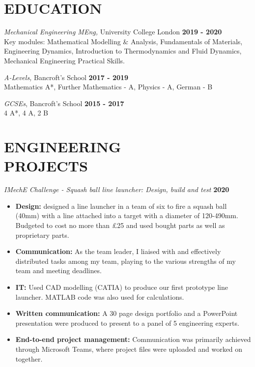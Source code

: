 \documentclass[margin, 10pt]{res} %
\begin{document}
\begin{resume}

 
\section{EDUCATION}  

{\sl Mechanical Engineering MEng,} University College London \hfill \textbf{2019 - 2020}\\
Key modules: Mathematical Modelling \& Analysis, Fundamentals of Materials,\\ 
Engineering Dynamics, Introduction to Thermodynamics and Fluid Dynamics, \\
Mechanical Engineering Practical Skills.

{\sl A-Levels,} Bancroft's School \hfill \textbf{2017 - 2019}\\
Mathematics A*, Further Mathematics - A, Physics - A, German - B

{\sl GCSEs}, Bancroft's School
\hfill \textbf{2015 - 2017}\\
4 A*, 4 A, 2 B



\section{ENGINEERING \\ PROJECTS}

{\sl IMechE Challenge - Squash ball line launcher: Design, build and test} \hfill \textbf{2020}\\
\begin{itemize}
  \item \textbf{Design:} designed a line launcher in a team of six to fire a squash ball (40\si{\milli\meter}) with a line attached into a target with a diameter of 120-490\si{\milli\meter}. Budgeted to cost no more than £25 and used bought parts as well as proprietary parts.
  \item \textbf{Communication:} As the team leader, I liaised with and effectively distributed tasks among my team, playing to the various strengths of my team and meeting deadlines.
  \item \textbf{IT:} Used CAD modelling (CATIA) to produce our first prototype line launcher. MATLAB code was also used for calculations. 
  \item \textbf{Written communication:} A 30 page design portfolio and a PowerPoint presentation were produced to present to a panel of 5 engineering experts. 
  \item \textbf{End-to-end project management:} Communication was primarily achieved through Microsoft Teams, where project files were uploaded and worked on together. 
\end{itemize}
 

\end{resume}
\end{document}
